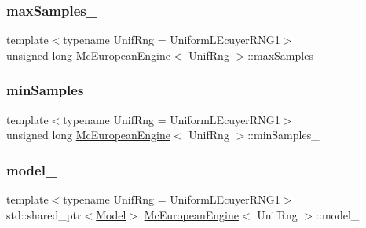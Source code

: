 \subsubsection{\texorpdfstring{max\+Samples\+\_\+}{maxSamples\_}}
{\footnotesize\ttfamily template$<$typename Unif\+Rng  = Uniform\+L\+Ecuyer\+R\+N\+G1$>$ \\
unsigned long \hyperlink{class_mc_european_engine}{Mc\+European\+Engine}$<$ Unif\+Rng $>$\+::max\+Samples\+\_\+\hspace{0.3cm}{\ttfamily [private]}}

\hypertarget{class_mc_european_engine_ab0811b021427b14b9e63afe57cf66f46}{}\label{class_mc_european_engine_ab0811b021427b14b9e63afe57cf66f46} 
\subsubsection{\texorpdfstring{min\+Samples\+\_\+}{minSamples\_}}
{\footnotesize\ttfamily template$<$typename Unif\+Rng  = Uniform\+L\+Ecuyer\+R\+N\+G1$>$ \\
unsigned long \hyperlink{class_mc_european_engine}{Mc\+European\+Engine}$<$ Unif\+Rng $>$\+::min\+Samples\+\_\+\hspace{0.3cm}{\ttfamily [private]}}

\hypertarget{class_mc_european_engine_ac9a776838f0c894f04c64491a6a0e931}{}\label{class_mc_european_engine_ac9a776838f0c894f04c64491a6a0e931} 
\subsubsection{\texorpdfstring{model\+\_\+}{model\_}}
{\footnotesize\ttfamily template$<$typename Unif\+Rng  = Uniform\+L\+Ecuyer\+R\+N\+G1$>$ \\
std\+::shared\+\_\+ptr$<$\hyperlink{class_model}{Model}$>$ \hyperlink{class_mc_european_engine}{Mc\+European\+Engine}$<$ Unif\+Rng $>$\+::model\+\_\+\hspace{0.3cm}{\ttfamily [private]}}

\hypertarget{class_mc_european_engine_a6cf4932a9ca4b0c8bd6d3f4a1a23367e}{}\label{class_mc_european_engine_a6cf4932a9ca4b0c8bd6d3f4a1a23367e} 
